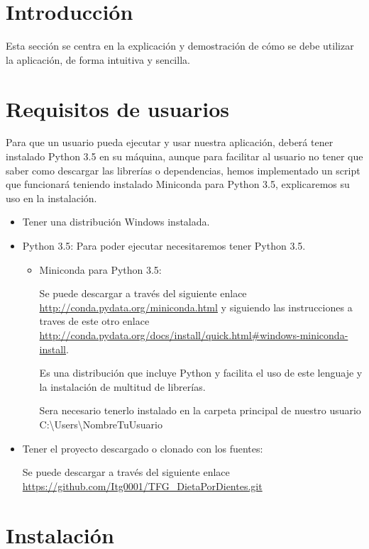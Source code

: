 
\section{Introducción}
Esta sección se centra en la explicación y demostración de cómo se debe utilizar la aplicación, de forma intuitiva y sencilla.
\section{Requisitos de usuarios}
Para que un usuario pueda ejecutar y usar nuestra aplicación, deberá tener instalado Python 3.5 en su máquina, aunque para facilitar al usuario no tener que saber como descargar las librerías o dependencias, hemos implementado un script que funcionará teniendo instalado Miniconda para Python 3.5, explicaremos su uso en la instalación.

\begin{itemize}
	\item Tener una distribución Windows instalada.

	\item Python 3.5: Para poder ejecutar necesitaremos tener Python 3.5.
	\begin{itemize}
		\item Miniconda para Python 3.5:
		
		Se puede descargar a través del siguiente enlace \url{http://conda.pydata.org/miniconda.html} y siguiendo las instrucciones a traves de este otro enlace \url{http://conda.pydata.org/docs/install/quick.html#windows-miniconda-install}.		
		
		Es una distribución que incluye Python y facilita el uso de este lenguaje y la instalación de multitud de librerías.
		
		Sera necesario tenerlo instalado en la carpeta principal de nuestro usuario \textrm{C:\textbackslash Users\textbackslash NombreTuUsuario}
	\end{itemize}
	
	\item Tener el proyecto descargado o clonado con los fuentes:
	
	Se puede descargar a través del siguiente enlace \url{https://github.com/Itg0001/TFG_DietaPorDientes.git}

\end{itemize}

\section{Instalación}

